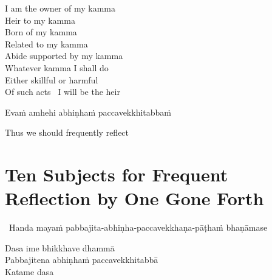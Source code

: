 \begin{english-verses}
  I am the owner of my kamma\\
  Heir to my kamma\\
  Born of my kamma\\
  Related to my kamma\\
  Abide supported by my kamma\\
  Whatever kamma I shall do\\
  Either skillful or harmful\\
  Of such acts \breathmark\ I will be the heir\ifdigitalversion\makeatletter\hyperlink{endnote98-appendix}\makeatother\fi
\end{english-verses}

Evaṁ amhehi abhiṇhaṁ paccavekkhitabbaṁ

\begin{english}
  Thus we should frequently reflect\ifdigitalversion\makeatletter\hyperlink{endnote146-appendix}\makeatother\fi
\end{english}

\suttaRef{[AN 5.57]}

\ifdigitalversion{}\fi



\section{Ten Subjects for Frequent Reflection by One Gone Forth}
\label{ten-reflections}

\begin{leader}
  \anglebracketleft\ \hspace{-0.5mm}Handa mayaṁ pabbajita-abhiṇha-paccavekkhaṇa-pāṭhaṁ bhaṇāmase \hspace{-0.5mm}\anglebracketright\
\end{leader}

Dasa ime bhikkhave dhammā\\
Pabbajitena abhiṇhaṁ paccavekkhitabbā\\
Katame dasa

